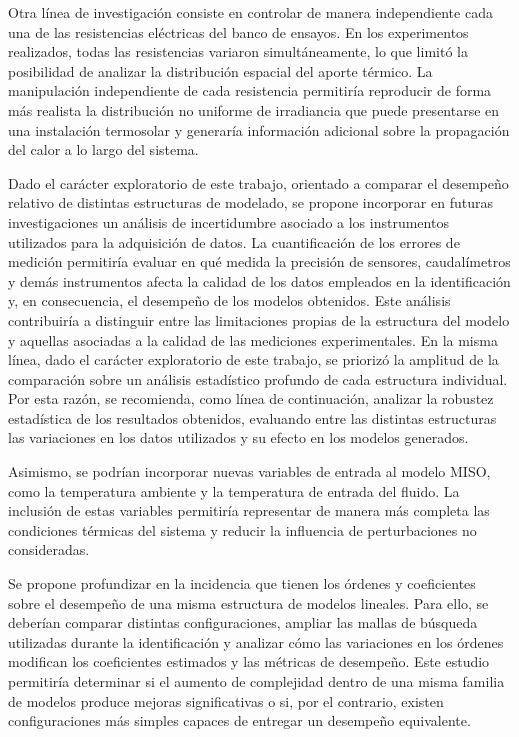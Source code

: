 \documentclass[11pt]{report}
\begin{document}
Otra línea de investigación consiste en controlar de manera independiente cada una de las resistencias eléctricas del banco de ensayos. En los experimentos realizados, todas las resistencias variaron simultáneamente, lo que limitó la posibilidad de analizar la distribución espacial del aporte térmico. La manipulación independiente de cada resistencia permitiría reproducir de forma más realista la distribución no uniforme de irradiancia que puede presentarse en una instalación termosolar y generaría información adicional sobre la propagación del calor a lo largo del sistema.

Dado el carácter exploratorio de este trabajo, orientado a comparar el desempeño relativo de distintas estructuras de modelado, se propone incorporar en futuras investigaciones un análisis de incertidumbre asociado a los instrumentos utilizados para la adquisición de datos. La cuantificación de los errores de medición permitiría evaluar en qué medida la precisión de sensores, caudalímetros y demás instrumentos afecta la calidad de los datos empleados en la identificación y, en consecuencia, el desempeño de los modelos obtenidos. Este análisis contribuiría a distinguir entre las limitaciones propias de la estructura del modelo y aquellas asociadas a la calidad de las mediciones experimentales. En la misma línea, dado el carácter exploratorio de este trabajo, se priorizó la amplitud de la comparación sobre un análisis estadístico profundo de cada estructura individual. Por esta razón, se recomienda, como línea de continuación, analizar la robustez estadística de los resultados obtenidos, evaluando entre las distintas estructuras las variaciones en los datos utilizados y su efecto en los modelos generados.

Asimismo, se podrían incorporar nuevas variables de entrada al modelo MISO, como la temperatura ambiente y la temperatura de entrada del fluido. La inclusión de estas variables permitiría representar de manera más completa las condiciones térmicas del sistema y reducir la influencia de perturbaciones no consideradas.

Se propone profundizar en la incidencia que tienen los órdenes y coeficientes sobre el desempeño de una misma estructura de modelos lineales. Para ello, se deberían comparar distintas configuraciones, ampliar las mallas de búsqueda utilizadas durante la identificación y analizar cómo las variaciones en los órdenes modifican los coeficientes estimados y las métricas de desempeño. Este estudio permitiría determinar si el aumento de complejidad dentro de una misma familia de modelos produce mejoras significativas o si, por el contrario, existen configuraciones más simples capaces de entregar un desempeño equivalente.
\end{document}

